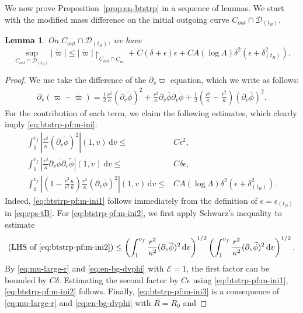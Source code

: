 \documentclass[10pt, reqno]{amsart}
\newtheorem{lemma}[theorem]{Lemma}
\theoremstyle{definition}
\theoremstyle{remark}
\theoremstyle{conjecture}
\numberwithin{equation}{section}
\newcommand{\abs}[1]{\vert#1\vert}
\newcommand{\ud}{\mathrm{d}}
\newcommand{\rd}{\partial}
\newcommand{\0}{\emptyset}
\newcommand{\dlt}{\delta}
\newcommand{\eps}{\epsilon}
\newcommand{\kpp}{\kappa}
\newcommand{\lmb}{\lambda}
\newcommand{\Lmb}{\Lambda}
\newcommand{\calD}{\mathcal D}
\newcommand{\calE}{\mathcal E}
\newcommand{\uC}{\underline{C}}
\newcommand{\dvr}{\lmb}
\newcommand{\phibg}{\overline{\phi}}				%
\newcommand{\rbg}{\overline{r}}					%
\newcommand{\varpibg}{\overline{\varpi}}				%
\newcommand{\kppbg}{\overline{\kpp}}					%
\newcommand{\phidf}{\widetilde{\phi}}				%
\newcommand{\varpidf}{\widetilde{\varpi}}				%
\newcommand{\Abs}[1]{\left\vert #1 \right\vert}
\begin{document}
We now prove Proposition~\ref{prop:en-btstrp} in a sequence of lemmas. We start with the modified mass difference on the initial outgoing curve $C_{out} \cap \calD_{(t_{B})}$.
\begin{lemma} \label{lem:btstrp-pf:m-ini}
On $C_{out} \cap \calD_{(t_{B})}$, we have
\begin{equation} \label{eq:btstrp-pf:m-ini}
	\sup_{C_{out} \cap \calD_{(t_{B})}} \abs{\varpidf} \leq \abs{\varpidf}\restriction_{C_{out} \cap \uC_{in}} + C (\dlt + \eps) \eps + C A (\log \Lmb) \dlt^{2} \left( \eps + \dlt_{(t_{B})}^{2} \right).
\end{equation}
\end{lemma}
\begin{proof}
We use take the difference of the $\rd_{v} \varpi$ equation, which we write as follows:
\begin{align*}
	\rd_{v} (\varpi - \varpibg) 
	= \frac{1}{2} \frac{r^{2}}{\kpp} (\rd_{v} \phidf)^{2}
		+\frac{r^{2}}{\kpp} \rd_{v} \phibg \rd_{v} \phidf 
		+ \frac{1}{2} \left(\frac{r^{2}}{\kpp} - \frac{\rbg^{2}}{\kppbg} \right) (\rd_{v} \phibg)^{2}.
\end{align*}
For the contribution of each term, we claim the following estimates, which clearly imply \eqref{eq:btstrp-pf:m-ini}:
\begin{align} 
	\int_{1}^{v_{f}} \Abs{\frac{r^{2}}{\kpp} (\rd_{v} \phidf)^{2}} (1, v) \, \ud v \leq & C \eps^{2}, 		\label{eq:btstrp-pf:m-ini1} \\
	\int_{1}^{v_{f}} \Abs{\frac{r^{2}}{\kpp} \rd_{v} \phibg \rd_{v} \phidf} (1, v)  \, \ud v \leq & C \dlt \eps, \label{eq:btstrp-pf:m-ini2} \\
	\int_{1}^{v_{f}} \Abs{\left(1 - \frac{\rbg^{2}}{r^{2}} \frac{\kpp}{\kppbg} \right) \frac{r^{2}}{\kpp} (\rd_{v} \phibg)^{2}} (1, v)  \, \ud v \leq & C A (\log \Lmb) \dlt^{2} \left( \eps + \dlt_{(t_{B})}^{2} \right).		\label{eq:btstrp-pf:m-ini3}
\end{align}
Indeed, \eqref{eq:btstrp-pf:m-ini1} follows immediately from the definition of $\eps = \eps_{(t_{B})}$ in \eqref{eq:eps-tB}. For \eqref{eq:btstrp-pf:m-ini2}, we first apply Schwarz's inequality to estimate
\begin{equation*}
	(\hbox{LHS of \eqref{eq:btstrp-pf:m-ini2}})
	\leq \left( \int_{1}^{v_{f}} \frac{r^{2}}{\kpp^{2}} (\rd_{v} \phibg)^{2}  \, \ud v \right)^{1/2} 
			\left( \int_{1}^{v_{f}} \frac{r^{2}}{\kpp^{2}} (\rd_{v} \phidf)^{2}  \, \ud v \right)^{1/2}.
\end{equation*}
By \eqref{eq:mu-large-r} and \eqref{eq:en-bg-dvphi} with $\calE =1$, the first factor can be bounded by $C \dlt$. Estimating the second factor by $C \eps$ using \eqref{eq:btstrp-pf:m-ini1}, \eqref{eq:btstrp-pf:m-ini2} follows. Finally, \eqref{eq:btstrp-pf:m-ini3} is a consequence of \eqref{eq:mu-large-r} and \eqref{eq:en-bg-dvphi} with $R = R_{0}$ and

\end{proof}
\end{document}
